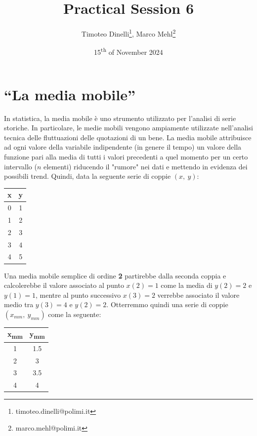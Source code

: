 \documentclass[oneside]{article}
\title{Practical Session 6}
\author{Timoteo Dinelli\footnote{timoteo.dinelli@polimi.it}, Marco Mehl\footnote{marco.mehl@polimi.it}}
\date{15\textsuperscript{th} of November 2024}
\begin{document}
\maketitle

\section{``La media mobile''}
In statistica, la media mobile è uno strumento utilizzato per l'analisi di serie
storiche. In particolare, le medie mobili vengono ampiamente utilizzate nell'analisi
tecnica delle fluttuazioni delle quotazioni di un bene. La media mobile attribuisce ad ogni valore della
variabile indipendente (in genere il tempo) un valore della funzione pari alla media di
tutti i valori precedenti a quel momento per un certo intervallo ($n$ elementi) riducendo
il "rumore" nei dati e mettendo in evidenza dei possibili trend.
Quindi, data la seguente serie di coppie $(x, \:y)$:

\begin{table}[h!]
   \centering
   \begin{tabular}{c | c}
      x & y \\ \hline
      0 & 1 \\
      1 & 2 \\
      2 & 3 \\
      3 & 4 \\
      4 & 5 \\ \hline
   \end{tabular}
\end{table}

Una media mobile semplice di ordine \textbf{2} partirebbe dalla seconda coppia e calcolerebbe il
valore associato al punto $x(2) = 1$ come la media di $y(2) = 2$ e $y(1) = 1$, mentre al punto
successivo $x(3) = 2$ verrebbe associato il valore medio tra $y(3) = 4$ e $y(2) = 2$. Otterremmo
quindi una serie di coppie $(x_{mm}, \: y_{mm})$ come la seguente:

\begin{table}[h!]
   \centering
   \begin{tabular}{c | c}
      x\textsubscript{mm} & y\textsubscript{mm} \\ \hline
      1 & 1.5 \\
      2 & 3 \\
      3 & 3.5 \\
      4 & 4 \\ \hline
   \end{tabular}
\end{table}
\end{document}
